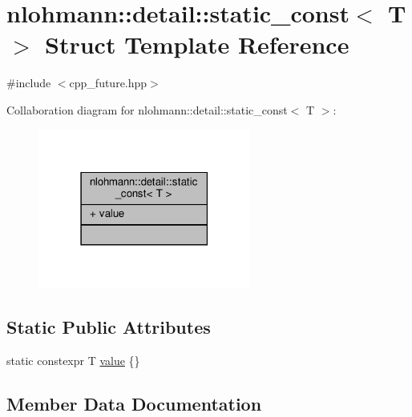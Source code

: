 \hypertarget{structnlohmann_1_1detail_1_1static__const}{}\section{nlohmann\+:\+:detail\+:\+:static\+\_\+const$<$ T $>$ Struct Template Reference}
\label{structnlohmann_1_1detail_1_1static__const}


{\ttfamily \#include $<$cpp\+\_\+future.\+hpp$>$}



Collaboration diagram for nlohmann\+:\+:detail\+:\+:static\+\_\+const$<$ T $>$\+:\nopagebreak
\begin{figure}[H]
\begin{center}
\leavevmode
\includegraphics[width=198pt]{structnlohmann_1_1detail_1_1static__const__coll__graph}
\end{center}
\end{figure}
\subsection*{Static Public Attributes}
\begin{DoxyCompactItemize}
\item 
static constexpr T \hyperlink{structnlohmann_1_1detail_1_1static__const_a6bb7ab2ddd6abc41fb4ffb7c6dfa237e}{value} \{\}
\end{DoxyCompactItemize}


\subsection{Member Data Documentation}
\mbox{\label{structnlohmann_1_1detail_1_1static__const_a6bb7ab2ddd6abc41fb4ffb7c6dfa237e}} 
